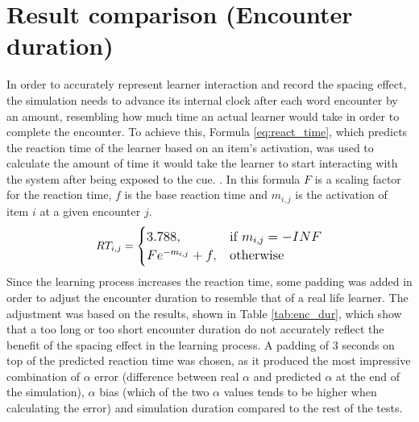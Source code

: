 \documentclass[a4paper]{report}
\begin{document}
\section{Result comparison (Encounter duration)}
In order to accurately represent learner interaction and record the spacing effect, the simulation needs to advance its internal clock after each word encounter by an amount, resembling how much time an actual learner would take in order to complete the encounter. To achieve this, Formula \ref{eq:react_time}, which predicts the reaction time of the learner based on an item's activation, was used to calculate the amount of time it would take the learner to start interacting with the system after being exposed to the cue. \citep{vans09}. In this formula $F$ is a scaling factor for the reaction time, $f$ is the base reaction time and $m_{i,j}$ is the activation of item $i$ at a given encounter $j$.
\begin{equation}
\begin{large}
\label{eq:react_time}
RT_{i,j} =  
\begin{cases}
    3.788, & \text{if } m_{i,j} = -INF \\
    Fe^{-m_{i,j}} + f,  & \text{otherwise}
\end{cases}
\end{large}
\end{equation}
Since the learning process increases the reaction time, some padding was added in order to adjust the encounter duration to resemble that of a real life learner. The adjustment was based on the results, shown in Table \ref{tab:enc_dur}, which show that a too long or too short encounter duration do not accurately reflect the benefit of the spacing effect in the learning process. A padding of 3 seconds on top of the predicted reaction time was chosen, as it produced the most impressive combination of $\alpha$ error (difference between real $\alpha$ and predicted $\alpha$ at the end of the simulation), $\alpha$ bias (which of the two $\alpha$ values tends to be higher when calculating the error) and simulation duration compared to the rest of the tests.
\end{document}
